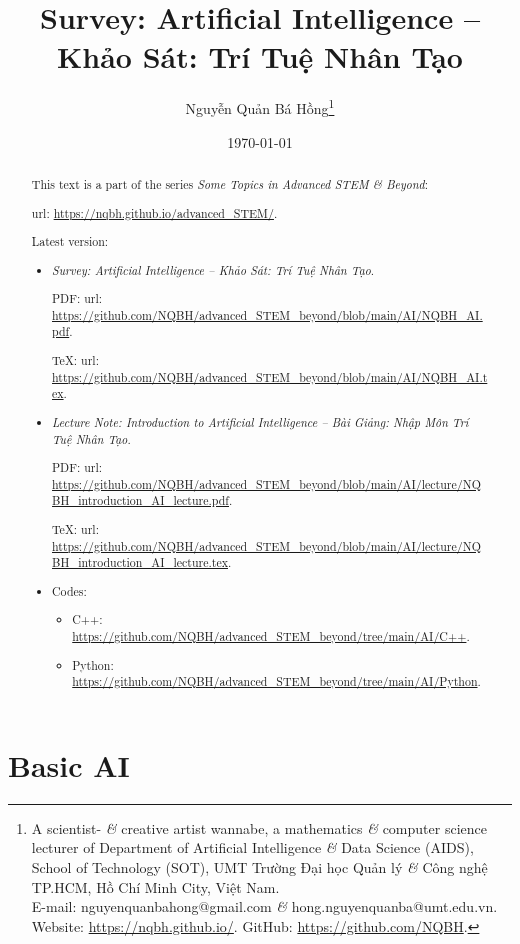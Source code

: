 \documentclass{article}
\title{Survey: Artificial Intelligence -- Khảo Sát: Trí Tuệ Nhân Tạo}
\author{Nguyễn Quản Bá Hồng\footnote{A scientist- {\it\&} creative artist wannabe, a mathematics {\it\&} computer science lecturer of Department of Artificial Intelligence {\it\&} Data Science (AIDS), School of Technology (SOT), UMT Trường Đại học Quản lý {\it\&} Công nghệ TP.HCM, Hồ Chí Minh City, Việt Nam.\\E-mail: {\sf nguyenquanbahong@gmail.com} {\it\&} {\sf hong.nguyenquanba@umt.edu.vn}. Website: \url{https://nqbh.github.io/}. GitHub: \url{https://github.com/NQBH}.}}
\date{\today}
\begin{document}
\maketitle
\begin{abstract}
	This text is a part of the series {\it Some Topics in Advanced STEM \& Beyond}:
	
	{\sc url}: \url{https://nqbh.github.io/advanced_STEM/}.
	
	Latest version:
	\begin{itemize}
		\item {\it Survey: Artificial Intelligence -- Khảo Sát: Trí Tuệ Nhân Tạo}.
		
		PDF: {\sc url}: \url{https://github.com/NQBH/advanced_STEM_beyond/blob/main/AI/NQBH_AI.pdf}.
		
		\TeX: {\sc url}: \url{https://github.com/NQBH/advanced_STEM_beyond/blob/main/AI/NQBH_AI.tex}.
		\item {\it Lecture Note: Introduction to Artificial Intelligence -- Bài Giảng: Nhập Môn Trí Tuệ Nhân Tạo}.
		
		PDF: {\sc url}: \url{https://github.com/NQBH/advanced_STEM_beyond/blob/main/AI/lecture/NQBH_introduction_AI_lecture.pdf}.
		
		\TeX: {\sc url}: \url{https://github.com/NQBH/advanced_STEM_beyond/blob/main/AI/lecture/NQBH_introduction_AI_lecture.tex}.
		\item Codes:
		\begin{itemize}
			\item C++: \url{https://github.com/NQBH/advanced_STEM_beyond/tree/main/AI/C++}.
			\item Python: \url{https://github.com/NQBH/advanced_STEM_beyond/tree/main/AI/Python}.
		\end{itemize}
	\end{itemize}
\end{abstract}
\tableofcontents


\section{Basic AI}
\end{document}
